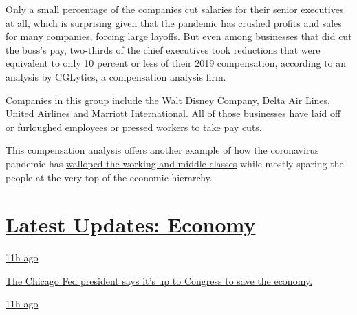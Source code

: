 Only a small percentage of the companies cut salaries for their senior
executives at all, which is surprising given that the pandemic has
crushed profits and sales for many companies, forcing large layoffs. But
even among businesses that did cut the boss's pay, two-thirds of the
chief executives took reductions that were equivalent to only 10 percent
or less of their 2019 compensation, according to an analysis by
CGLytics, a compensation analysis firm.

Companies in this group include the Walt Disney Company, Delta Air
Lines, United Airlines and Marriott International. All of those
businesses have laid off or furloughed employees or pressed workers to
take pay cuts.

This compensation analysis offers another example of how the coronavirus
pandemic has
\href{https://www.nytimes3xbfgragh.onion/2020/03/15/world/europe/coronavirus-inequality.html}{walloped
the working and middle classes} while mostly sparing the people at the
very top of the economic hierarchy.

\hypertarget{latest-updates-economy}{%
\section{\texorpdfstring{\href{https://www.nytimes3xbfgragh.onion/live/2020/08/03/business/stock-market-today-coronavirus?action=click\&pgtype=Article\&state=default\&region=MAIN_CONTENT_1\&context=storylines_live_updates}{Latest
Updates:
Economy}}{Latest Updates: Economy}}\label{latest-updates-economy}}

\href{https://www.nytimes3xbfgragh.onion/live/2020/08/03/business/stock-market-today-coronavirus?action=click\&pgtype=Article\&state=default\&region=MAIN_CONTENT_1\&context=storylines_live_updates\#the-chicago-fed-president-says-its-up-to-congress-to-save-the-economy}{11h
ago}

\href{https://www.nytimes3xbfgragh.onion/live/2020/08/03/business/stock-market-today-coronavirus?action=click\&pgtype=Article\&state=default\&region=MAIN_CONTENT_1\&context=storylines_live_updates\#the-chicago-fed-president-says-its-up-to-congress-to-save-the-economy}{The
Chicago Fed president says it's up to Congress to save the economy.}

\href{https://www.nytimes3xbfgragh.onion/live/2020/08/03/business/stock-market-today-coronavirus?action=click\&pgtype=Article\&state=default\&region=MAIN_CONTENT_1\&context=storylines_live_updates\#faa-says-boeing-has-effectively-mitigated-defects-in-the-737-max}{11h
ago}

